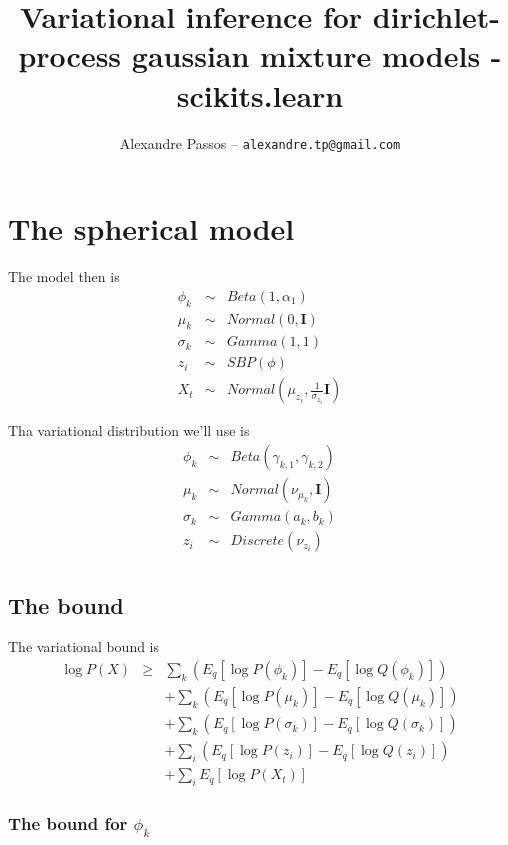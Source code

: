 \documentclass{article}
\title{Variational inference for dirichlet-process gaussian mixture models - scikits.learn}
\author{Alexandre Passos -- \texttt{alexandre.tp@gmail.com}}
\newcommand{\m}[1]{\nu_{#1}}
\begin{document}
\date{}
\maketitle{}


\section{The spherical model}

 The model then is
\begin{eqnarray*}
  \phi_k   &\sim& Beta(1, \alpha_1) \\
  \mu_k   &\sim& Normal(0,  \mathbf{I}) \\
  \sigma_k &\sim& Gamma(1, 1) \\
  z_{i}     &\sim& SBP(\phi) \\
  X_t &\sim& Normal(\mu_{z_i}, \frac{1}{\sigma_{z_i}} \mathbf{I})
\end{eqnarray*}

Tha variational distribution we'll use is
\begin{eqnarray*}
  \phi_k   &\sim& Beta(\gamma_{k,1}, \gamma_{k,2}) \\
  \mu_k   &\sim& Normal(\m{\mu_k},  \mathbf{I}) \\
  \sigma_k &\sim& Gamma(a_{k}, b_{k}) \\
  z_{i}     &\sim& Discrete(\m{z_i}) \\
\end{eqnarray*}

\subsection{The bound}
\label{sec:bound}

The variational bound is
\begin{eqnarray*}
  \log P(X) &\ge& 
  \sum_k (E_q[\log P(\phi_k)] - E_q[\log Q(\phi_k)]) \\
  &&
  +\sum_k \left( E_q[\log P(\mu_k)] - E_q[\log Q(\mu_k)] \right) \\
  &&
  +\sum_k \left( E_q[\log P(\sigma_k)] - E_q[\log Q(\sigma_k)] \right) \\
  &&
  +\sum_i \left( E_q[\log P(z_i)] - E_q[\log Q(z_i)] \right) \\
  &&
  +\sum_i E_q[\log P(X_t)]
\end{eqnarray*}


\subsubsection{The bound for $\phi_k$}
\label{sec:bound-phi}
\end{document}
